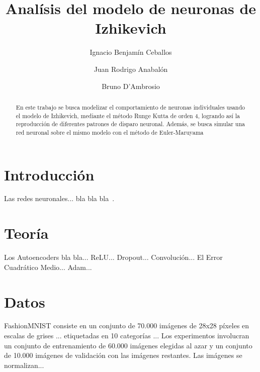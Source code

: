 \documentclass[aps,prl,preprint,groupedaddress]{revtex4-2}
\begin{document}

\title{
Analísis del modelo de neuronas de Izhikevich
}


\author{Ignacio Benjamín Ceballos}

\author{Juan Rodrigo Anabalón}

\author{Bruno D'Ambrosio}



\begin{abstract}
En este trabajo se busca modelizar el comportamiento de neuronas individuales  usando el modelo de Izhikevich, mediante el método Runge Kutta de orden 4, logrando así la reproducción de diferentes patrones de disparo neuronal. Además, se busca simular una red neuronal sobre el mismo modelo con el método de Euler-Maruyama
\end{abstract}


\maketitle

\section{Introducción}

Las redes neuronales... bla bla bla~\cite{hertz1999introduction}.

\section{Teoría}

Los Autoencoders bla bla...
ReLU...
Dropout...
Convolución...
El Error Cuadrático Medio...
Adam...

\section{Datos}

FashionMNIST consiste en un conjunto de 70.000 imágenes de 28x28 píxeles en escalas de grises ... etiquetadas en 10 categorías ...
Los experimentos involucran un conjunto de entrenamiento de 60.000 imágenes elegidas al azar y un conjunto de 10.000 imágenes de validación con las imágenes restantes.
Las imágenes se normalizan...
\end{document}
